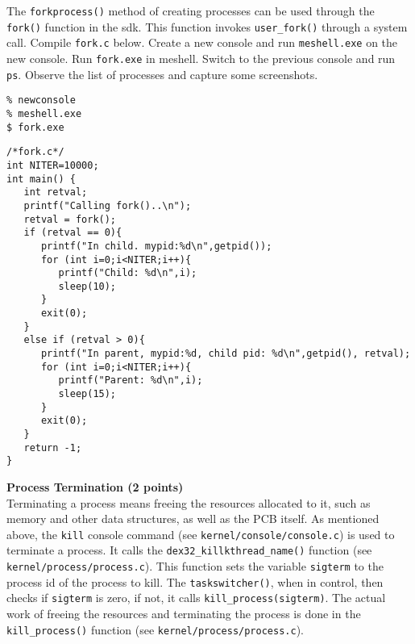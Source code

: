 \documentclass[a4paper, 11pt,oneside]{article}
\begin{document}
\noindent{}

The \texttt{forkprocess()} method of creating processes can be used through the \texttt{fork()} function in the sdk. This function invokes  
\texttt{user\_fork()} through a system call. Compile \texttt{fork.c} below. Create a new console and run \texttt{meshell.exe} on the new console. Run \texttt{fork.exe} in meshell. Switch to the previous console and run \texttt{ps}. Observe the list of processes and capture some screenshots.
\begin{Verbatim}[frame=single]
% cd /icsos/apps
% newconsole
% meshell.exe
$ fork.exe
\end{Verbatim}

\begin{Verbatim}[frame=single]
/*fork.c*/
int NITER=10000;
int main() {
   int retval;
   printf("Calling fork()..\n");
   retval = fork();
   if (retval == 0){
      printf("In child. mypid:%d\n",getpid());
      for (int i=0;i<NITER;i++){
         printf("Child: %d\n",i);
         sleep(10);
      }
      exit(0);
   }
   else if (retval > 0){
      printf("In parent, mypid:%d, child pid: %d\n",getpid(), retval);
      for (int i=0;i<NITER;i++){
         printf("Parent: %d\n",i);
         sleep(15);
      }
      exit(0);
   }
   return -1;
}
\end{Verbatim}

\textbf{Process Termination (2 points)} \\

Terminating a process means freeing the resources allocated to it,  such as memory and other data structures, as well as the PCB itself. As mentioned above, the \texttt{kill} console command (see \texttt{kernel/console/console.c}) is used to terminate a process. It calls the 
\texttt{dex32\_killkthread\_name()} function (see \texttt{kernel/process/process.c}). This function sets 
the  variable \texttt{sigterm} to the process id of the process to kill. The \texttt{taskswitcher()}, when in control, then checks if \texttt{sigterm} is zero, if not, it calls \texttt{kill\_process(sigterm)}. 
The actual work of freeing the resources and terminating the process is done in the \texttt{kill\_process()} function (see \texttt{kernel/process/process.c}).
\end{document}
